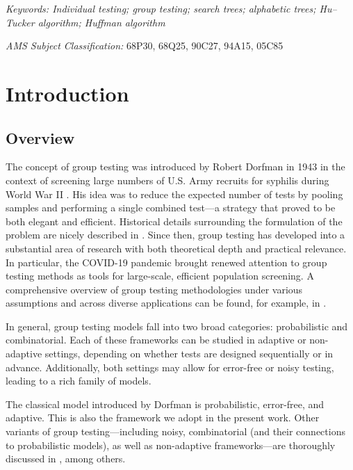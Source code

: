 \documentclass[12pt]{article}
\begin{document}
\noindent%
{\it Keywords: Individual testing; group testing; search trees; alphabetic trees; Hu–Tucker algorithm; Huffman algorithm }
\medskip

\noindent
{\it AMS Subject Classification:} 68P30, 68Q25, 90C27, 94A15, 05C85 \vfill


\newpage
{} %
\section{Introduction }

\subsection{Overview}
The concept of group testing was introduced by Robert Dorfman in 1943 in the context of screening large numbers of U.S. Army recruits for syphilis during World War II \citep{D1943}.
His idea was to reduce the expected number of tests by pooling samples and performing a single combined test—a strategy that proved to be both elegant and efficient.
Historical details surrounding the formulation of the problem are nicely described in \cite{Dh1999}. Since then, group testing has developed into a substantial area of research with both theoretical depth and practical
relevance. In particular, the COVID-19 pandemic brought renewed attention to group testing methods as tools for large-scale, efficient population screening. A comprehensive overview of group testing methodologies under various assumptions and across diverse applications can be found, for example, in \cite{K1973, Dh1999, AJS2019, MA2019}.

In general, group testing models fall into two broad categories: probabilistic and combinatorial. Each of these frameworks can be studied in adaptive or non-adaptive settings,
depending on whether tests are designed sequentially or in advance. Additionally, both settings may allow for error-free or noisy testing, leading to a rich family of models.

The classical model introduced by Dorfman is probabilistic, error-free, and adaptive. This is also the framework we adopt in the present work.
Other variants of group testing—including noisy, combinatorial (and their connections to probabilistic models), as well as non-adaptive frameworks—are thoroughly discussed in \cite{K1973, Dh1999, Dh2006, BM2017, AJS2019, P2021, NZ2022, N2023, HO2025}, among others.
\end{document}
